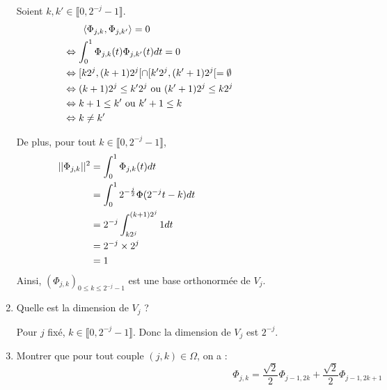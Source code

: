 \documentclass[12pt,a4paper]{article}
\begin{document}
\begin{enumerate}
    \color{blue}
    Soient $k, k' \in \llbracket 0, 2^{-j} - 1 \rrbracket$.
    \begin{align*}
        & \qquad \langle \Phi_{j,k}, \Phi_{j,k'} \rangle = 0 \hspace{14.5cm} \\
        & \Leftrightarrow \int_{0}^{1} \Phi_{j,k}(t) \Phi_{j,k'}(t) dt = 0 \\
        & \Leftrightarrow [k2^j, (k+1)2^j[ \cap [k'2^j, (k'+1)2^j[ = \emptyset \\
        & \Leftrightarrow (k+1)2^j \leq k'2^j \text{ ou } (k'+1)2^j \leq k2^j \\
        & \Leftrightarrow k + 1 \leq k' \text{ ou } k' + 1 \leq k \\
        & \Leftrightarrow k \neq k'
    \end{align*}

    De plus, pour tout $k \in \llbracket 0, 2^{-j} - 1 \rrbracket$,
    \begin{align*}
        ||\Phi_{j,k}||^2 &= \int_{0}^{1} \Phi_{j,k}(t) dt \hspace{14.5cm} \\
        &= \int_{0}^{1} 2^{-\frac{j}{2}} \Phi(2^{-j} t - k) dt \\
        &= 2^{-j} \int_{k2^j}^{(k+1)2^j} 1 dt \\
        &= 2^{-j} \times 2^j \\
        &= 1
    \end{align*}
    Ainsi, $(\Phi_{j,k})_{0 \leq k \leq 2^{-j} - 1}$ est une base orthonormée de $V_j$.\\


    \color{black}
    \item Quelle est la dimension de $V_j$ ?
    
    \color{blue}
    Pour $j$ fixé, $k \in \llbracket 0, 2^{-j} - 1 \rrbracket$. Donc la dimension de $V_j$ est $2^{-j}$.\\
    

    \color{black}
    \item Montrer que pour tout couple $(j,k) \in \Omega$, on a :
    \begin{equation}
        \Phi_{j,k} = \frac{\sqrt{2}}{2} \Phi_{j-1, 2k} + \frac{\sqrt{2}}{2} \Phi_{j-1, 2k+1}
        \label{eq:decomposition}
    \end{equation}


\end{enumerate}
\end{document}
